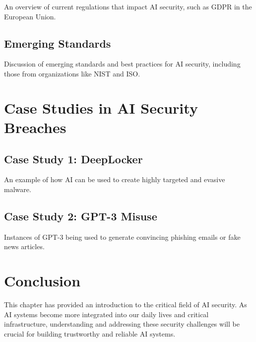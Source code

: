 An overview of current regulations that impact AI security, such as GDPR
in the European Union.

\subsection{Emerging Standards}

Discussion of emerging standards and best practices for AI security,
including those from organizations like NIST and ISO.

\section{Case Studies in AI Security Breaches}

\subsection{Case Study 1: DeepLocker}

An example of how AI can be used to create highly targeted and evasive
malware.

\subsection{Case Study 2: GPT-3 Misuse}

Instances of GPT-3 being used to generate convincing phishing emails or
fake news articles.

\section{Conclusion}

This chapter has provided an introduction to the critical field of AI
security. As AI systems become more integrated into our daily lives and
critical infrastructure, understanding and addressing these security
challenges will be crucial for building trustworthy and reliable AI
systems.


